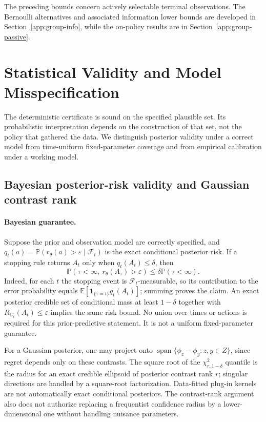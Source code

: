 \documentclass{article}
\theoremstyle{plain}
\theoremstyle{definition}
\begin{document}
The preceding bounds concern actively selectable terminal observations. The Bernoulli alternatives and associated information lower bounds are developed in Section~\ref{app:group-info}, while the on-policy results are in Section~\ref{app:group-passive}.

\clearpage

\section{Statistical Validity and Model Misspecification}
\label{app:group-robust}

The deterministic certificate is sound on the specified plausible set. Its probabilistic interpretation depends on the construction of that set, not the policy that gathered the data. We distinguish posterior validity under a correct model from time-uniform fixed-parameter coverage and from empirical calibration under a working model.

\subsection{Bayesian posterior-risk validity and Gaussian contrast rank}
\label{app:posterior-calibration}

\paragraph{Bayesian guarantee.}
Suppose the prior and observation model are correctly specified, and
$q_t(a)=\mathbb P(r_\theta(a)>\varepsilon\mid\mathcal F_t)$ is the exact
conditional posterior risk.  If a stopping rule returns $A_t$ only when
$q_t(A_t)\le\delta$, then
\begin{equation}
 \mathbb P(\tau<\infty,\ r_\theta(A_\tau)>\varepsilon)
 \le\delta\mathbb P(\tau<\infty).
 \label{eq:bay-posterior-risk}
\end{equation}
Indeed, for each $t$ the stopping event is $\mathcal F_t$-measurable,
so its contribution to the error probability equals
$\mathbb E[\mathbf1_{\{\tau=t\}}q_t(A_t)]$; summing proves the claim.
An exact posterior credible set of conditional mass at least $1-\delta$
together with $R_{C_t}(A_t)\le\varepsilon$ implies the same risk bound.
No union over times or actions is required for this prior-predictive
statement.  It is not a uniform fixed-parameter guarantee.

For a Gaussian posterior, one may project onto
$\operatorname{span}\{\phi_z-\phi_y:z,y\in Z\}$, since regret depends
only on these contrasts.  The square root of the
$\chi^2_{r,1-\delta}$ quantile is the radius for an exact credible
ellipsoid of posterior contrast rank $r$; singular directions are
handled by a square-root factorization.  Data-fitted plug-in kernels
are not automatically exact conditional posteriors.  The contrast-rank
argument also does not authorize replacing a frequentist confidence
radius by a lower-dimensional one without handling nuisance parameters.
\end{document}
